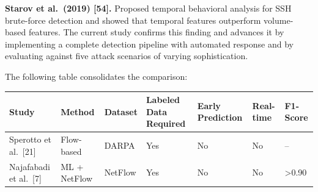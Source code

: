 \documentclass[
  a4paper]{report}
\newcounter{none} %
\begin{document}
\textbf{Starov et al.~(2019) {[}54{]}.} Proposed temporal behavioral
analysis for SSH brute-force detection and showed that temporal features
outperform volume-based features. The current study confirms this
finding and advances it by implementing a complete detection pipeline
with automated response and by evaluating against five attack scenarios
of varying sophistication.

The following table consolidates the comparison:

{\def\LTcaptype{none} %
\begin{longtable}[]{@{}
  >{\raggedright\arraybackslash}p{}
  >{\raggedright\arraybackslash}p{}
  >{\raggedright\arraybackslash}p{}
  >{\raggedright\arraybackslash}p{}
  >{\raggedright\arraybackslash}p{}
  >{\raggedright\arraybackslash}p{}
  >{\raggedright\arraybackslash}p{}@{}}
\toprule\noalign{}
\begin{minipage}[b]{\linewidth}\raggedright
Study
\end{minipage} & \begin{minipage}[b]{\linewidth}\raggedright
Method
\end{minipage} & \begin{minipage}[b]{\linewidth}\raggedright
Dataset
\end{minipage} & \begin{minipage}[b]{\linewidth}\raggedright
Labeled Data Required
\end{minipage} & \begin{minipage}[b]{\linewidth}\raggedright
Early Prediction
\end{minipage} & \begin{minipage}[b]{\linewidth}\raggedright
Real-time
\end{minipage} & \begin{minipage}[b]{\linewidth}\raggedright
F1-Score
\end{minipage} \\
\midrule\noalign{}
\endhead
\bottomrule\noalign{}
\endlastfoot
Sperotto et al.~{[}21{]} & Flow-based & DARPA & Yes & No & No & -- \\
Najafabadi et al.~{[}7{]} & ML + NetFlow & NetFlow & Yes & No & No &
\textgreater0.90 \\

\end{longtable}}
\end{document}
